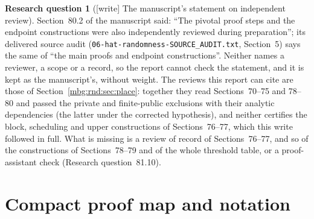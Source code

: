 \documentclass[11pt,letterpaper]{article}
\theoremstyle{definition}
\newtheorem{question}[theorem]{Research question}
\begin{document}
\begin{question}[{[write]} The manuscript's statement on independent review]
\label{mbg:rnd:q:review}
Section~80.2 of the manuscript said: ``The pivotal proof steps and the endpoint constructions were also independently reviewed during preparation''; its delivered source audit (\texttt{06-hat-randomness-\allowbreak SOURCE\_\allowbreak AUDIT.txt}, Section~5) says the same of ``the main proofs and endpoint constructions''. Neither names a reviewer, a scope or a record, so the report cannot check the statement, and it is kept as the manuscript's, without weight. The reviews this report can cite are those of Section~\ref{mbg:rnd:sec:place}: together they read Sections~70--75 and 78--80 and passed the private and finite-public exclusions with their analytic dependencies (the latter under the corrected hypothesis), and neither certifies the block, scheduling and upper constructions of Sections~76--77, which this write followed in full. What is missing is a review of record of Sections~76--77, and so of the constructions of Sections~78--79 and of the whole threshold table, or a proof-assistant check (Research question~81.10).
\end{question}

\setcounter{section}{7}
\renewcommand{\thesection}{\Alph{section}}
\renewcommand{\theHsection}{rnd.app.\Alph{section}}
\makeatletter\gdef\Hy@chapapp{\Hy@appendixstring}\makeatother
\section{Compact proof map and notation}
\label{mbg:rnd:app:map}
\end{document}
